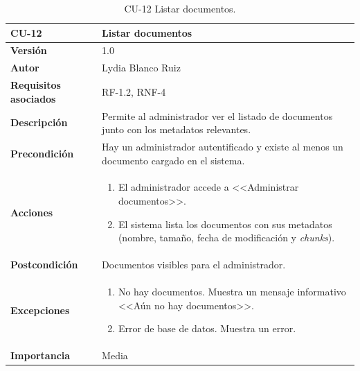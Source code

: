 \begin{table}[p]
	\centering
	\begin{tabularx}{\linewidth}{ p{} p{} }
		\toprule
		\textbf{CU-12}    & \textbf{Listar documentos}\\
		\toprule
		\textbf{Versión}              & 1.0    \\
		\textbf{Autor}                & Lydia Blanco Ruiz \\
		\textbf{Requisitos asociados} & RF-1.2, RNF-4 \\
		\textbf{Descripción}          & Permite al administrador ver el listado de documentos junto con los metadatos relevantes. \\
		\textbf{Precondición}         & Hay un administrador autentificado y existe al menos un documento cargado en el sistema. \\
		\textbf{Acciones}             &
		\begin{enumerate}
			\def\labelenumi{\arabic{enumi}.}
			\tightlist
			\item El administrador accede a <<Administrar documentos>>.
			\item El sistema lista los documentos con sus metadatos (nombre, tamaño, fecha de modificación y \textit{chunks}).
		\end{enumerate}\\
		\textbf{Postcondición}        & Documentos visibles para el administrador. \\
		\textbf{Excepciones}          & 
		\begin{enumerate}
			\def\labelenumi{\arabic{enumi}.}
			\tightlist
			\item No hay documentos. Muestra un mensaje informativo <<Aún no hay documentos>>.
			\item Error de base de datos. Muestra un error.
		\end{enumerate}\\
		\textbf{Importancia}          & Media  \\
		\bottomrule
	\end{tabularx}
	\caption{CU-12 Listar documentos.}
\end{table}

